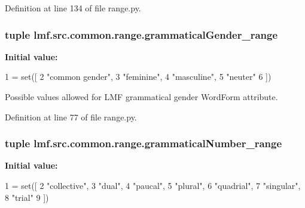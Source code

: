 Definition at line 134 of file range.\+py.

\hypertarget{namespacelmf_1_1src_1_1common_1_1range_ad872b4a301271d86df2980b34e15ffc4}{
\subsubsection[{grammatical\+Gender\+\_\+range}]{\setlength{\rightskip}{0pt plus 5cm}tuple lmf.\+src.\+common.\+range.\+grammatical\+Gender\+\_\+range}}\label{namespacelmf_1_1src_1_1common_1_1range_ad872b4a301271d86df2980b34e15ffc4}
{\bfseries Initial value\+:}
\begin{DoxyCode}
1 = set([
2     \textcolor{stringliteral}{"common gender"},
3     \textcolor{stringliteral}{"feminine"},
4     \textcolor{stringliteral}{"masculine"},
5     \textcolor{stringliteral}{"neuter"}
6 ])
\end{DoxyCode}


Possible values allowed for L\+M\+F grammatical gender Word\+Form attribute. 



Definition at line 77 of file range.\+py.

\hypertarget{namespacelmf_1_1src_1_1common_1_1range_ae3353d03f04380d7379bd193af24a1ad}{
\subsubsection[{grammatical\+Number\+\_\+range}]{\setlength{\rightskip}{0pt plus 5cm}tuple lmf.\+src.\+common.\+range.\+grammatical\+Number\+\_\+range}}\label{namespacelmf_1_1src_1_1common_1_1range_ae3353d03f04380d7379bd193af24a1ad}
{\bfseries Initial value\+:}
\begin{DoxyCode}
1 = set([
2     \textcolor{stringliteral}{"collective"},
3     \textcolor{stringliteral}{"dual"},
4     \textcolor{stringliteral}{"paucal"},
5     \textcolor{stringliteral}{"plural"},
6     \textcolor{stringliteral}{"quadrial"},
7     \textcolor{stringliteral}{"singular"},
8     \textcolor{stringliteral}{"trial"}
9 ])
\end{DoxyCode}


